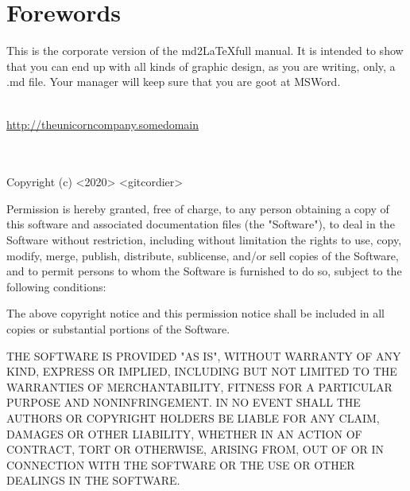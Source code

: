 \documentclass[a4paper, 11pt, titlepage, openany]{article}
\author{Git Cordier \\\texttt{admin@gcordier.eu}}\setlength\parindent{0pt}
\begin{document}



\section*{Forewords}
This is the corporate version of the md2\LaTeX full manual.
It is intended to show that you can end up with all kinds of graphic design, 
as you are writing, only, a .md file. 
Your manager will keep sure that you are goot at MSWord.


\vspace{7cm}
{\color{corporate_blue}{THE UNICORN COMPANY}}\\
\href{https://github.com/gitcordier}{\underline{http://theunicorncompany.somedomain}}\\
\href{mailto:admin@gcordier.eu}{}\\
\\
{\fw Copyright (c) <2020> <gitcordier>

Permission is hereby granted, free of charge, to any person obtaining a copy
of this software and associated documentation files (the "Software"), to deal
in the Software without restriction, including without limitation the rights
to use, copy, modify, merge, publish, distribute, sublicense, and/or sell
copies of the Software, and to permit persons to whom the Software is
furnished to do so, subject to the following conditions:

The above copyright notice and this permission notice shall be included in all
copies or substantial portions of the Software.

THE SOFTWARE IS PROVIDED "AS IS", WITHOUT WARRANTY OF ANY KIND, EXPRESS OR
IMPLIED, INCLUDING BUT NOT LIMITED TO THE WARRANTIES OF MERCHANTABILITY,
FITNESS FOR A PARTICULAR PURPOSE AND NONINFRINGEMENT. IN NO EVENT SHALL THE
AUTHORS OR COPYRIGHT HOLDERS BE LIABLE FOR ANY CLAIM, DAMAGES OR OTHER
LIABILITY, WHETHER IN AN ACTION OF CONTRACT, TORT OR OTHERWISE, ARISING FROM,
OUT OF OR IN CONNECTION WITH THE SOFTWARE OR THE USE OR OTHER DEALINGS IN THE
SOFTWARE.}
\newpage


\tableofcontents\newpage





\newcommand{\var}[1]{\${#1}}
\end{document}
